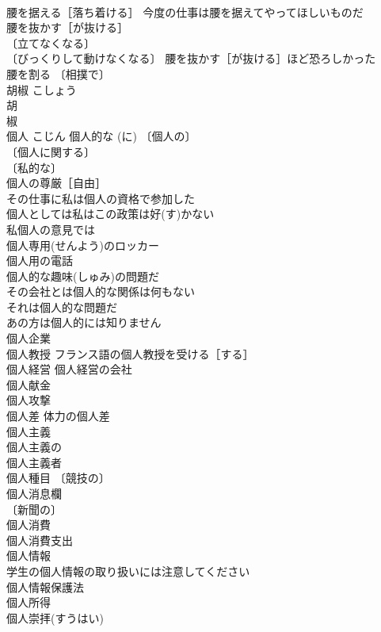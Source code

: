 \documentclass[8pt]{extreport}
\begin{document}
\begin{CJK}{UTF8}{min}
\\	腰を据える［落ち着ける］ 今度の仕事は腰を据えてやってほしいものだ 
\\	腰を抜かす［が抜ける］ 
\\	〔立てなくなる〕
\\	〔びっくりして動けなくなる〕 腰を抜かす［が抜ける］ほど恐ろしかった 
\\	腰を割る 〔相撲で〕
\\	胡椒	こしょう	
\\	胡　
\\	椒 
\\	個人	こじん	個人的な (に) 〔個人の〕
\\	〔個人に関する〕
\\	〔私的な〕
\\	個人の尊厳［自由］ 
\\	その仕事に私は個人の資格で参加した 
\\	個人としては私はこの政策は好(す)かない 
\\	私個人の意見では 
\\	個人専用(せんよう)のロッカー 
\\	個人用の電話 
\\	個人的な趣味(しゅみ)の問題だ 
\\	その会社とは個人的な関係は何もない 
\\	それは個人的な問題だ 
\\	あの方は個人的には知りません 
\\	個人企業 
\\	個人教授 フランス語の個人教授を受ける［する］ 
\\	個人経営 個人経営の会社 
\\	個人献金 
\\	個人攻撃 
\\	個人差 体力の個人差 
\\	個人主義 
\\	個人主義の 
\\	個人主義者 
\\	個人種目 〔競技の〕
\\	個人消息欄 
\\	〔新聞の〕
\\	個人消費 
\\	個人消費支出 
\\	個人情報 
\\	学生の個人情報の取り扱いには注意してください 
\\	個人情報保護法 
\\	個人所得 
\\	個人崇拝(すうはい) 

\end{CJK}
\end{document}
